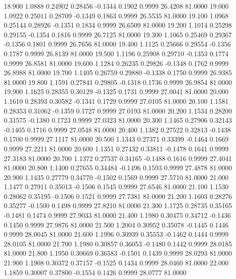   18.900   1.0888   0.24902   0.28456  -0.1344   0.1902   0.9999  26.4208  81.0000
  19.000   1.0922   0.25011   0.28709  -0.1349   0.1863   0.9999  26.5535  81.0000
  19.100   1.0968   0.25144   0.28926  -0.1351   0.1834   0.9999  26.6509  81.0000
  19.200   1.1014   0.25298   0.29155  -0.1354   0.1816   0.9999  26.7125  81.0000
  19.300   1.1065   0.25469   0.29367  -0.1356   0.1801   0.9999  26.7656  81.0000
  19.400   1.1125   0.25666   0.29554  -0.1356   0.1787   0.9999  26.8139  81.0000
  19.500   1.1196   0.25908   0.29710  -0.1353   0.1774   0.9999  26.8581  81.0000
  19.600   1.1284   0.26235   0.29826  -0.1348   0.1762   0.9999  26.8988  81.0000
  19.700   1.1405   0.26759   0.29880  -0.1338   0.1750   0.9999  26.9385  81.0000
  19.800   1.1591   0.27841   0.29805  -0.1318   0.1736   0.9999  26.9854  81.0000
  19.900   1.1625   0.28355   0.30129  -0.1325   0.1731   0.9999  27.0041  81.0000
  20.000   1.1610   0.28393   0.30582  -0.1341   0.1729   0.9999  27.0105  81.0000
  20.100   1.1581   0.28353   0.31062  -0.1359   0.1727   0.9999  27.0193  81.0000
  20.200   1.1534   0.28200   0.31575  -0.1380   0.1723   0.9999  27.0323  81.0000
  20.300   1.1465   0.27906   0.32143  -0.1405   0.1716   0.9999  27.0548  81.0000
  20.400   1.1382   0.27522   0.32813  -0.1438   0.1700   0.9999  27.1117  81.0000
  20.500   1.1343   0.27371   0.33399  -0.1464   0.1669   0.9999  27.2211  81.0000
  20.600   1.1351   0.27432   0.33811  -0.1478   0.1641   0.9999  27.3183  81.0000
  20.700   1.1372   0.27537   0.34165  -0.1488   0.1616   0.9999  27.4041  81.0000
  20.800   1.1400   0.27655   0.34484  -0.1496   0.1593   0.9999  27.4878  81.0000
  20.900   1.1435   0.27779   0.34770  -0.1502   0.1569   0.9999  27.5710  81.0000
  21.000   1.1477   0.27911   0.35013  -0.1506   0.1545   0.9999  27.6546  81.0000
  21.100   1.1530   0.28062   0.35195  -0.1506   0.1521   0.9999  27.7381  81.0000
  21.200   1.1603   0.28276   0.35277  -0.1500   0.1498   0.9999  27.8210  81.0000
  21.300   1.1725   0.28735   0.35165  -0.1481   0.1474   0.9999  27.9033  81.0000
  21.400   1.1980   0.30475   0.34712  -0.1436   0.1450   0.9999  27.9876  81.0000
  21.500   1.2004   0.30952   0.35078  -0.1445   0.1446   0.9999  28.0045  81.0000
  21.600   1.1996   0.30939   0.35553  -0.1462   0.1444   0.9999  28.0105  81.0000
  21.700   1.1980   0.30857   0.36053  -0.1480   0.1442   0.9999  28.0185  81.0000
  21.800   1.1950   0.30669   0.36583  -0.1501   0.1439   0.9999  28.0293  81.0000
  21.900   1.1908   0.30372   0.37157  -0.1525   0.1434   0.9999  28.0460  81.0000
  22.000   1.1859   0.30007   0.37800  -0.1554   0.1426   0.9999  28.0777  81.0000
